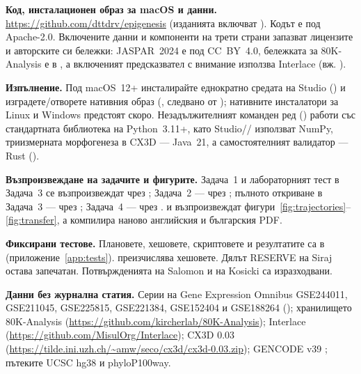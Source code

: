 \documentclass[10.5pt,a4paper]{article}
\begin{document}
\textbf{Код, инсталационен образ  за macOS и данни.} \url{https://github.com/dttdrv/epigenesis} (изданията включват ). Кодът е под Apache-2.0. Включените данни и компоненти на трети страни запазват лицензите и авторските си бележки: JASPAR~2024 е под CC~BY~4.0, бележката за 80K-Analysis е в , а включеният предсказвател с внимание използва Interlace (вж. ).

\textbf{Изпълнение.} Под macOS~12+ инсталирайте еднократно средата на Studio () и изградете/отворете нативния образ (, следвано от ); нативните инсталатори за Linux и Windows предстоят скоро\texttrademark. Незадължителният команден ред () работи със стандартната библиотека на Python~3.11+, като Studio// използват NumPy, триизмерната морфогенеза в CX3D — Java~21, а самостоятелният валидатор  — Rust ().

\textbf{Възпроизвеждане на задачите и фигурите.} Задача~1 и лабораторният тест в Задача~3 се възпроизвеждат чрез ; Задача~2 — чрез ; пълното откриване в Задача~3 — чрез ; Задача~4 — чрез .  и  възпроизвеждат фигури~\ref{fig:trajectories}--\ref{fig:transfer}, а  компилира наново английския и българския PDF.

\textbf{Фиксирани тестове.} Плановете, хешовете, скриптовете и резултатите са в  (приложение~\ref{app:tests}).  преизчислява хешовете. Дялът RESERVE на Siraj остава запечатан. Потвържденията на Salomon и на Kosicki са изразходвани.

\textbf{Данни без журнална статия.} Серии на Gene Expression Omnibus GSE244011, GSE211045, GSE225815, GSE221384, GSE152404 и GSE188264 (\citealt{kreimer2022}); хранилището 80K-Analysis (\url{https://github.com/kircherlab/80K-Analysis}); Interlace (\url{https://github.com/MisulOrg/Interlace}); CX3D 0.03 (\url{https://tilde.ini.uzh.ch/~amw/seco/cx3d/cx3d-0.03.zip}); GENCODE v39 \citep{frankish2021}; пътеките UCSC hg38 и phyloP100way.
\end{document}
